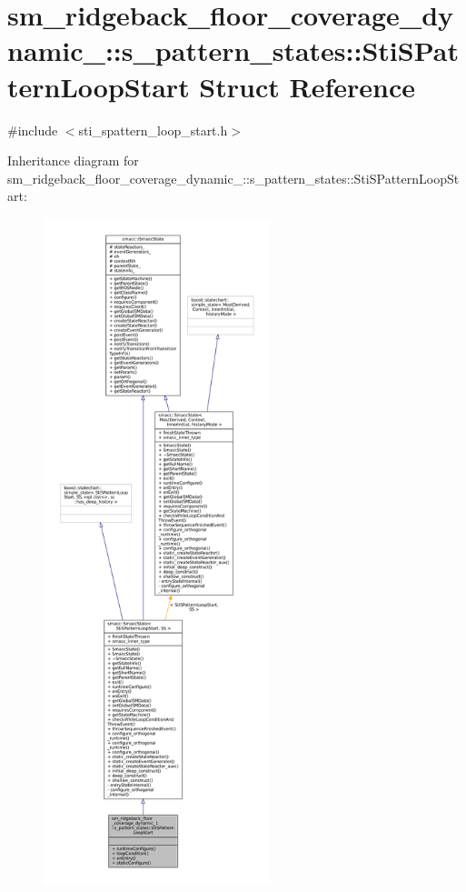 \hypertarget{structsm__ridgeback__floor__coverage__dynamic__1_1_1s__pattern__states_1_1StiSPatternLoopStart}{}\section{sm\+\_\+ridgeback\+\_\+floor\+\_\+coverage\+\_\+dynamic\+\_\+:\+:s\+\_\+pattern\+\_\+states\+:\+:Sti\+S\+Pattern\+Loop\+Start Struct Reference}
\label{structsm__ridgeback__floor__coverage__dynamic__1_1_1s__pattern__states_1_1StiSPatternLoopStart}


{\ttfamily \#include $<$sti\+\_\+spattern\+\_\+loop\+\_\+start.\+h$>$}



Inheritance diagram for sm\+\_\+ridgeback\+\_\+floor\+\_\+coverage\+\_\+dynamic\+\_\+:\+:s\+\_\+pattern\+\_\+states\+:\+:Sti\+S\+Pattern\+Loop\+Start\+:
\nopagebreak
\begin{figure}[H]
\begin{center}
\leavevmode
\includegraphics[height=550pt]{structsm__ridgeback__floor__coverage__dynamic__1_1_1s__pattern__states_1_1StiSPatternLoopStart__inherit__graph}
\end{center}
\end{figure}


